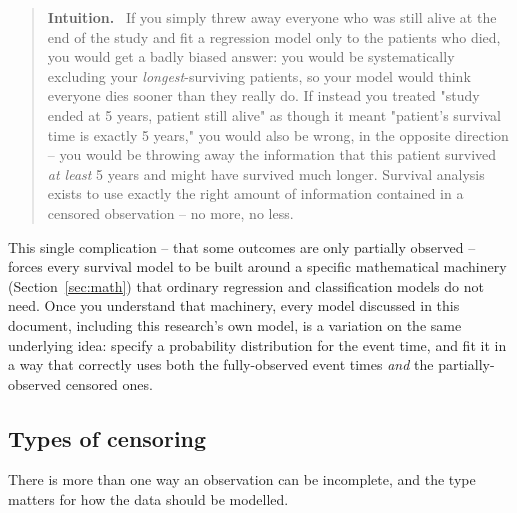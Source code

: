 \documentclass[11pt]{article}
\newenvironment{intuition}
  {\par\addvspace{8pt}\begin{quote}\noindent\textbf{\textcolor{blue!40!black}{Intuition.}}\ }
  {\end{quote}\par\addvspace{8pt}}
\begin{document}
\begin{intuition}
If you simply threw away everyone who was still alive at the end of the
study and fit a regression model only to the patients who died, you would
get a badly biased answer: you would be systematically excluding your
\emph{longest}-surviving patients, so your model would think everyone
dies sooner than they really do. If instead you treated "study ended at
5 years, patient still alive" as though it meant "patient's survival time
is exactly 5 years," you would also be wrong, in the opposite direction --
you would be throwing away the information that this patient survived
\emph{at least} 5 years and might have survived much longer. Survival
analysis exists to use exactly the right amount of information contained
in a censored observation -- no more, no less.
\end{intuition}

This single complication -- that some outcomes are only partially
observed -- forces every survival model to be built around a specific
mathematical machinery (Section~\ref{sec:math}) that ordinary regression
and classification models do not need. Once you understand that
machinery, every model discussed in this document, including this
research's own model, is a variation on the same underlying idea: specify
a probability distribution for the event time, and fit it in a way that
correctly uses both the fully-observed event times \emph{and} the
partially-observed censored ones.

\subsection{Types of censoring}
\label{sec:censoring-types}

There is more than one way an observation can be incomplete, and the type
matters for how the data should be modelled.
\end{document}
